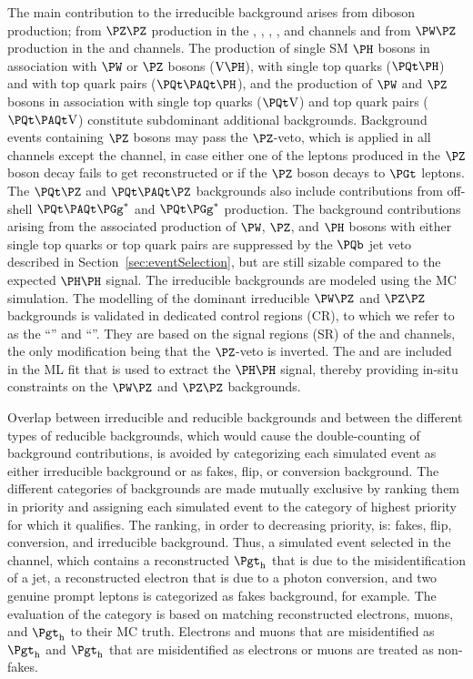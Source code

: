 The main contribution to the irreducible background arises from diboson production;
from $\PZ\PZ$ production in the \zeroLeptonFourTau, \oneLeptonThreeTau, \twoLeptonTwoTau, \threeLeptonOneTau, and \fourLeptonZeroTau channels
and from $\PW\PZ$ production in the \twoLeptonssZeroTau and \threeLeptonZeroTau channels.
The production of single SM $\PHiggs$ bosons in association with $\PW$ or $\PZ$ bosons ($\V\PHiggs$), with single top quarks ($\tH$) and with top quark pairs ($\ttH$),
and the production of $\PW$ and $\PZ$ bosons in association with single top quarks ($\tV$) and top quark pairs ($\ttV$) constitute subdominant additional backgrounds.
Background events containing $\PZ$ bosons may pass the $\PZ$-veto, which is applied in all channels except the \zeroLeptonFourTau channel,
in case either one of the leptons produced in the $\PZ$ boson decay fails to get reconstructed or if the $\PZ$ boson decays to $\PGt$ leptons.
The $\tZ$ and $\ttZ$ backgrounds also include contributions from off-shell $\Ptop\APtop\Pggx$ and $\Ptop\Pggx$ production.
The background contributions arising from the associated production of $\PW$, $\PZ$, and $\PHiggs$ bosons with either single top quarks or top quark pairs
are suppressed by the $\Pbottom$ jet veto described in Section~\ref{sec:eventSelection}, but are still sizable compared to the expected $\PHiggs\PHiggs$ signal.
The irreducible backgrounds are modeled using the MC simulation.
The modelling of the dominant irreducible $\PW\PZ$ and $\PZ\PZ$ backgrounds is validated in dedicated control regions (CR),
to which we refer to as the ``\threeLeptonCR'' and ``\fourLeptonCR''.
They are based on the signal regions (SR) of the \threeLeptonZeroTau and \fourLeptonZeroTau channels,
the only modification being that the $\PZ$-veto is inverted.
The \threeLeptonCR and \fourLeptonCR are included in the ML fit that is used to extract the $\PHiggs\PHiggs$ signal,
thereby providing in-situ constraints on the $\PW\PZ$ and $\PZ\PZ$ backgrounds.

Overlap between irreducible and reducible backgrounds and between the different types of reducible backgrounds,
which would cause the double-counting of background contributions,
is avoided by categorizing each simulated event as either irreducible background or as fakes, flip, or conversion background.
The different categories of backgrounds are made mutually exclusive by ranking them in priority and assigning each simulated event to the category of highest priority for which it qualifies.
The ranking, in order to decreasing priority, is: fakes, flip, conversion, and irreducible background.
Thus, a simulated event selected in the \threeLeptonOneTau channel, which contains a reconstructed $\tauh$ that is due to the misidentification of a jet,
a reconstructed electron that is due to a photon conversion, and two genuine prompt leptons is categorized as fakes background, for example.
The evaluation of the category is based on matching reconstructed electrons, muons, and $\tauh$ to their MC truth.
Electrons and muons that are misidentified as $\tauh$ and $\tauh$ that are misidentified as electrons or muons are treated as non-fakes.



